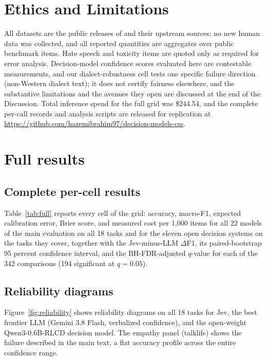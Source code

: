 \documentclass[11pt]{article}
\begin{document}
\section{Ethics and Limitations}
All datasets are the public releases of \citet{ziems2024llms} and their upstream sources; no new human data was collected, and all reported quantities are aggregates over public benchmark items. Hate speech and toxicity items are quoted only as required for error analysis. Decision-model confidence scores evaluated here are contestable measurements, and our dialect-robustness cell tests one specific failure direction (non-Western dialect text); it does not certify fairness elsewhere, and the substantive limitations and the avenues they open are discussed at the end of the Discussion. Total inference spend for the full grid was \$244.54, and the complete per-call records and analysis scripts are released for replication at \url{https://github.com/hazemibrahim97/decision-models-css}.




\appendix

\section{Full results}
\label{app:registered}

\subsection{Complete per-cell results}
Table~\ref{tab:full} reports every cell of the grid: accuracy, macro-F1, expected calibration error, Brier score, and measured cost per 1{,}000 items for all 22 models of the main evaluation on all 18 tasks and for the eleven open decision systems on the tasks they cover, together with the Jev-minus-LLM $\Delta$F1, its paired-bootstrap 95 percent confidence interval, and the BH-FDR-adjusted $q$-value for each of the 342 comparisons (194 significant at $q = 0.05$).

\subsection{Reliability diagrams}
Figure~\ref{fig:reliability} shows reliability diagrams on all 18 tasks for Jev, the best frontier LLM (Gemini 3.8 Flash, verbalized confidence), and the open-weight Qwen3-0.6B-RLCD decision model. The empathy panel (talklife) shows the failure described in the main text, a flat accuracy profile across the entire confidence range.
\end{document}

